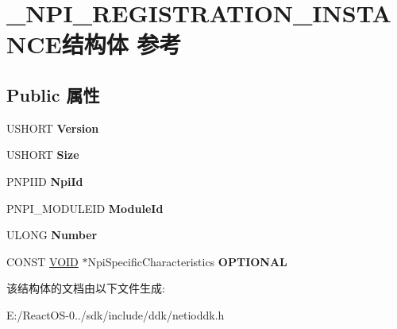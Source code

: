 \hypertarget{struct___n_p_i___r_e_g_i_s_t_r_a_t_i_o_n___i_n_s_t_a_n_c_e}{}\section{\+\_\+\+N\+P\+I\+\_\+\+R\+E\+G\+I\+S\+T\+R\+A\+T\+I\+O\+N\+\_\+\+I\+N\+S\+T\+A\+N\+C\+E结构体 参考}
\label{struct___n_p_i___r_e_g_i_s_t_r_a_t_i_o_n___i_n_s_t_a_n_c_e}
\subsection*{Public 属性}
\begin{DoxyCompactItemize}
\item 
\mbox{\label{struct___n_p_i___r_e_g_i_s_t_r_a_t_i_o_n___i_n_s_t_a_n_c_e_a64c55c7d179a0d90fa1a5ea4033b5653}} 
U\+S\+H\+O\+RT {\bfseries Version}
\item 
\mbox{\label{struct___n_p_i___r_e_g_i_s_t_r_a_t_i_o_n___i_n_s_t_a_n_c_e_aeb0c7e71830d896618174a144ac9d8be}} 
U\+S\+H\+O\+RT {\bfseries Size}
\item 
\mbox{\label{struct___n_p_i___r_e_g_i_s_t_r_a_t_i_o_n___i_n_s_t_a_n_c_e_aec46714f224ec7c12f7ad61eeef84682}} 
P\+N\+P\+I\+ID {\bfseries Npi\+Id}
\item 
\mbox{\label{struct___n_p_i___r_e_g_i_s_t_r_a_t_i_o_n___i_n_s_t_a_n_c_e_a0dbe8c741ecaab0106d371e84f2cdfe7}} 
P\+N\+P\+I\+\_\+\+M\+O\+D\+U\+L\+E\+ID {\bfseries Module\+Id}
\item 
\mbox{\label{struct___n_p_i___r_e_g_i_s_t_r_a_t_i_o_n___i_n_s_t_a_n_c_e_a7890dc4476298f998760fefa2480b79b}} 
U\+L\+O\+NG {\bfseries Number}
\item 
\mbox{\label{struct___n_p_i___r_e_g_i_s_t_r_a_t_i_o_n___i_n_s_t_a_n_c_e_a50b835da59a4c18cde83361539e0a3b6}} 
C\+O\+N\+ST \hyperlink{interfacevoid}{V\+O\+ID} $\ast$Npi\+Specific\+Characteristics {\bfseries O\+P\+T\+I\+O\+N\+AL}
\end{DoxyCompactItemize}


该结构体的文档由以下文件生成\+:\begin{DoxyCompactItemize}
\item 
E\+:/\+React\+O\+S-\/0../sdk/include/ddk/netioddk.\+h\end{DoxyCompactItemize}
